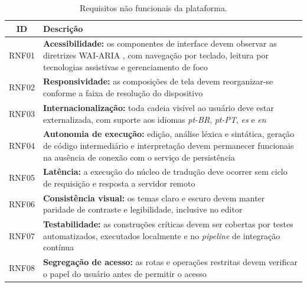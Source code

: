 \begin{table}[htbp]
    \centering
    \caption{Requisitos não funcionais da plataforma.}
    \label{tab:requisitos-nao-funcionais}
    \footnotesize
    \setlength{\tabcolsep}{4pt}
    \renewcommand{\arraystretch}{1.15}
    \begin{tabular}{|c|>{\raggedright\arraybackslash}p{12.3cm}|}
        \hline
        \textbf{ID} & \textbf{Descrição} \\
        \hline
        RNF01 & \textbf{Acessibilidade:} os componentes de interface devem observar as diretrizes WAI-ARIA \cite{w3c2023aria}, com navegação por teclado, leitura por tecnologias assistivas e gerenciamento de foco \\
        \hline
        RNF02 & \textbf{Responsividade:} as composições de tela devem reorganizar-se conforme a faixa de resolução do dispositivo \\
        \hline
        RNF03 & \textbf{Internacionalização:} toda cadeia visível ao usuário deve estar externalizada, com suporte aos idiomas \textit{pt-BR}, \textit{pt-PT}, \textit{es} e \textit{en} \\
        \hline
        RNF04 & \textbf{Autonomia de execução:} edição, análise léxica e sintática, geração de código intermediário e interpretação devem permanecer funcionais na ausência de conexão com o serviço de persistência \\
        \hline
        RNF05 & \textbf{Latência:} a execução do núcleo de tradução deve ocorrer sem ciclo de requisição e resposta a servidor remoto \\
        \hline
        RNF06 & \textbf{Consistência visual:} os temas claro e escuro devem manter paridade de contraste e legibilidade, inclusive no editor \\
        \hline
        RNF07 & \textbf{Testabilidade:} as construções críticas devem ser cobertas por testes automatizados, executados localmente e no \textit{pipeline} de integração contínua \\
        \hline
        RNF08 & \textbf{Segregação de acesso:} as rotas e operações restritas devem verificar o papel do usuário antes de permitir o acesso \\
        \hline
    \end{tabular}
\end{table}



